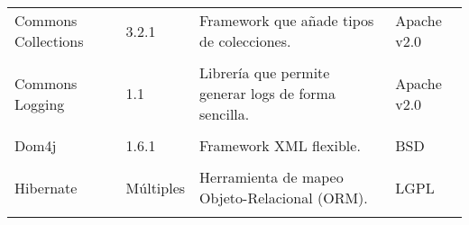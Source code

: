 \begin{longtable}[]{@{}llll@{}}
\begin{minipage}[t]{0.18\columnwidth}\raggedright\strut
Commons Collections \cite{lic:col} \strut
\end{minipage} & \begin{minipage}[t]{0.08\columnwidth}\raggedright\strut
3.2.1\strut
\end{minipage} & \begin{minipage}[t]{0.49\columnwidth}\raggedright\strut
Framework que añade tipos de colecciones.\strut
\end{minipage} & \begin{minipage}[t]{0.11\columnwidth}\raggedright\strut
Apache v2.0\strut
\end{minipage}\tabularnewline\tabularnewline


\begin{minipage}[t]{0.18\columnwidth}\raggedright\strut
Commons Logging \cite{lic:colog} \strut
\end{minipage} & \begin{minipage}[t]{0.08\columnwidth}\raggedright\strut
1.1\strut
\end{minipage} & \begin{minipage}[t]{0.49\columnwidth}\raggedright\strut
Librería que permite generar logs de forma sencilla.\strut
\end{minipage} & \begin{minipage}[t]{0.11\columnwidth}\raggedright\strut
Apache v2.0\strut
\end{minipage}\tabularnewline\tabularnewline


\begin{minipage}[t]{0.18\columnwidth}\raggedright\strut
Dom4j \cite{lic:dom} \strut
\end{minipage} & \begin{minipage}[t]{0.08\columnwidth}\raggedright\strut
1.6.1\strut
\end{minipage} & \begin{minipage}[t]{0.49\columnwidth}\raggedright\strut
Framework XML flexible.\strut
\end{minipage} & \begin{minipage}[t]{0.11\columnwidth}\raggedright\strut
BSD\strut
\end{minipage}\tabularnewline\tabularnewline


\begin{minipage}[t]{0.18\columnwidth}\raggedright\strut
Hibernate \cite{lic:hiber} \strut
\end{minipage} & \begin{minipage}[t]{0.08\columnwidth}\raggedright\strut
Múltiples\strut
\end{minipage} & \begin{minipage}[t]{0.49\columnwidth}\raggedright\strut
Herramienta de mapeo Objeto-Relacional (ORM).\strut
\end{minipage} & \begin{minipage}[t]{0.11\columnwidth}\raggedright\strut
LGPL\strut
\end{minipage}\tabularnewline\tabularnewline



\end{longtable}
